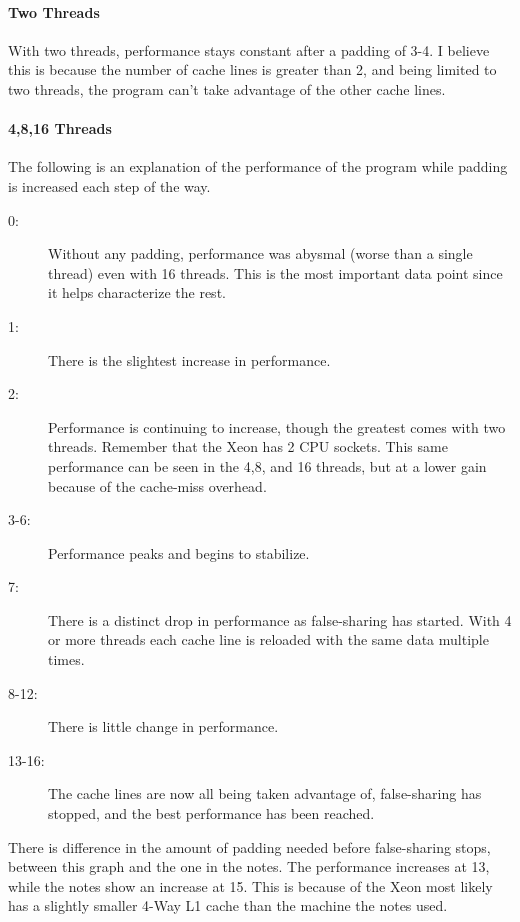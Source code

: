 \documentclass[12pt]{article}
\begin{document}
\paragraph{Two Threads}
With two threads, performance stays constant after a padding of 3-4. I
believe this is because the number of cache lines is greater than 2, and
being limited to two threads, the program can't take advantage of the
other cache lines.

\paragraph{4,8,16 Threads}
The following is an explanation of the performance of the program while
padding is increased each step of the way.

\begin{description}
    \item[0:] Without any padding, performance was abysmal (worse than a
        single thread) even with 16 threads. This is the most important
        data point since it helps characterize the rest.
    \item[1:] There is the slightest increase in performance.
    \item[2:] Performance is continuing to increase, though the greatest
        comes with two threads. Remember that the Xeon has 2 CPU
        sockets. This same performance can be seen in the 4,8, and 16
        threads, but at a lower gain because of the cache-miss overhead.
    \item[3-6:] Performance peaks and begins to stabilize.
    \item[7:] There is a distinct drop in performance as false-sharing
        has started. With 4 or more threads each cache line is reloaded
        with the same data multiple times.
    \item[8-12:] There is little change in performance.
    \item[13-16:] The cache lines are now all being taken advantage of,
        false-sharing has stopped, and the best performance has been
        reached.
\end{description}

There is difference in the amount of padding needed before false-sharing
stops, between this graph and the one in the notes. The performance
increases at 13, while the notes show an increase at 15. This is because
of the Xeon most likely has a slightly smaller 4-Way L1 cache than the
machine the notes used.

\twocolumn
\end{document}
